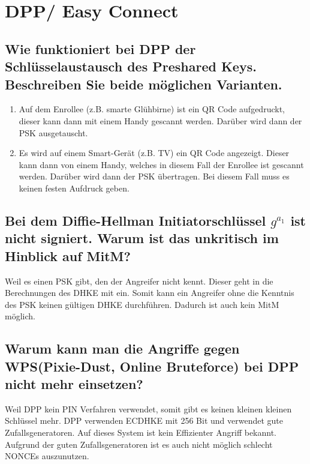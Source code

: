 \section{DPP/ Easy Connect}
\subsection{Wie funktioniert bei DPP der Schlüsselaustausch des Preshared Keys. Beschreiben Sie beide möglichen Varianten.}

\begin{enumerate}
    \item Auf dem Enrollee (z.B. smarte Glühbirne) ist ein QR Code aufgedruckt, dieser kann dann mit einem Handy gescannt werden. Darüber wird dann der PSK ausgetauscht.
    \item Es wird auf einem Smart-Gerät (z.B. TV) ein QR Code angezeigt. Dieser kann dann von einem Handy, welches in diesem Fall der Enrollee ist gescannt werden. Darüber wird dann der PSK übertragen. Bei diesem Fall muss es keinen festen Aufdruck geben.
\end{enumerate}

\subsection{Bei dem Diffie-Hellman Initiatorschlüssel $g^{a_1}$ ist nicht signiert. Warum ist das unkritisch im Hinblick auf MitM?}

Weil es einen PSK gibt, den der Angreifer nicht kennt. Dieser geht in die Berechnungen des DHKE mit ein. Somit kann ein Angreifer ohne die Kenntnis des PSK keinen gültigen DHKE durchführen. Dadurch ist auch kein MitM möglich.

\subsection{Warum kann man die Angriffe gegen WPS(Pixie-Dust, Online Bruteforce) bei DPP nicht mehr einsetzen?}

Weil DPP kein PIN Verfahren verwendet, somit gibt es keinen kleinen kleinen Schlüssel mehr. DPP verwenden ECDHKE mit 256 Bit und verwendet gute Zufallsgeneratoren. Auf dieses System ist kein Effizienter Angriff bekannt. Aufgrund der guten Zufallsgeneratoren ist es auch nicht möglich schlecht NONCEs auszunutzen.